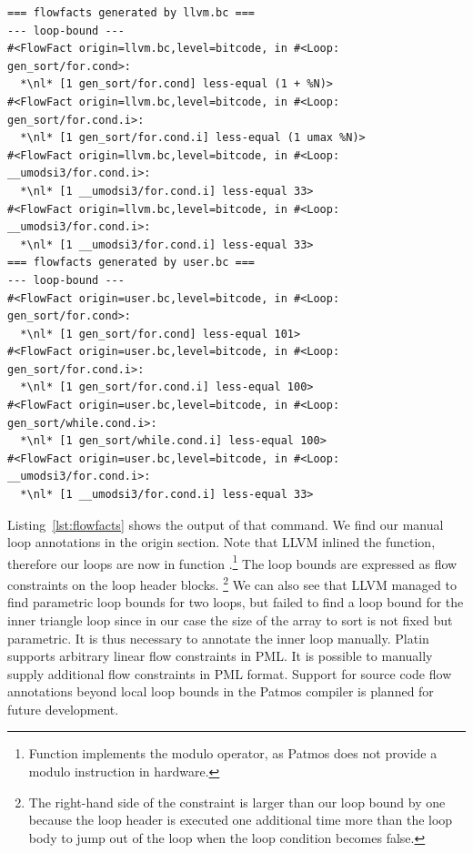 \lstset{escapechar=*}
\newcommand{\nl}{\raisebox{0ex}[0ex][0ex]{\ensuremath{\hookrightarrow}}}
\begin{lstlisting}[float=t,caption={Flow facts from LLVM and user annotations as reported by \code{platin}},label=lst:flowfacts]
=== flowfacts generated by llvm.bc ===
--- loop-bound ---
#<FlowFact origin=llvm.bc,level=bitcode, in #<Loop: gen_sort/for.cond>:
  *\nl* [1 gen_sort/for.cond] less-equal (1 + %N)>
#<FlowFact origin=llvm.bc,level=bitcode, in #<Loop: gen_sort/for.cond.i>:
  *\nl* [1 gen_sort/for.cond.i] less-equal (1 umax %N)>
#<FlowFact origin=llvm.bc,level=bitcode, in #<Loop: __umodsi3/for.cond.i>:
  *\nl* [1 __umodsi3/for.cond.i] less-equal 33>
#<FlowFact origin=llvm.bc,level=bitcode, in #<Loop: __umodsi3/for.cond.i>:
  *\nl* [1 __umodsi3/for.cond.i] less-equal 33>
=== flowfacts generated by user.bc ===
--- loop-bound ---
#<FlowFact origin=user.bc,level=bitcode, in #<Loop: gen_sort/for.cond>:
  *\nl* [1 gen_sort/for.cond] less-equal 101>
#<FlowFact origin=user.bc,level=bitcode, in #<Loop: gen_sort/for.cond.i>:
  *\nl* [1 gen_sort/for.cond.i] less-equal 100>
#<FlowFact origin=user.bc,level=bitcode, in #<Loop: gen_sort/while.cond.i>:
  *\nl* [1 gen_sort/while.cond.i] less-equal 100>
#<FlowFact origin=user.bc,level=bitcode, in #<Loop: __umodsi3/for.cond.i>:
  *\nl* [1 __umodsi3/for.cond.i] less-equal 33>
\end{lstlisting}

Listing~\ref{lst:flowfacts} shows the output of that command. We find our manual loop annotations in the
 origin section. Note that LLVM inlined the  function, therefore our loops
are now in function .\footnote{Function  implements the modulo operator, as
Patmos does not provide a modulo instruction in hardware.}
The loop bounds are expressed as flow constraints on the loop header blocks.%
\footnote{The right-hand side of the constraint is larger than our loop bound by one because the loop header
is executed one additional time more than the loop body to jump out of the loop when the loop condition becomes false.}
%
We can also see that LLVM managed to find parametric loop bounds for two loops, but failed to find a loop bound for the
inner triangle loop since in our case the size of the array to sort is not fixed but parametric. It is thus necessary
to annotate the inner loop manually.
%
Platin supports arbitrary linear flow constraints in PML. It is possible to manually supply additional flow constraints
in PML format.
Support for source code flow annotations beyond local loop bounds in the Patmos compiler is planned for future development.

